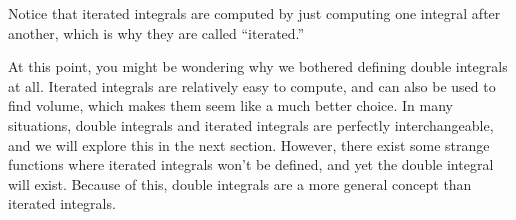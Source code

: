 \documentclass{ximera}
\begin{document}
Notice that iterated integrals are computed by just computing one integral after another, which is why they are called ``iterated.''

At this point, you might be wondering why we bothered defining double integrals at all. Iterated integrals are relatively easy to compute, and can also be used to find volume, which makes them seem like a much better choice. In many situations, double integrals and iterated integrals are perfectly interchangeable, and we will explore this in the next section. However, there exist some strange functions where iterated integrals won't be defined, and yet the double integral will exist. Because of this, double integrals are a more general concept than iterated integrals.
\end{document}
